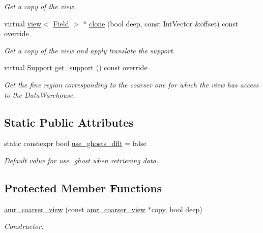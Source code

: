 \begin{DoxyCompactItemize}
\begin{DoxyCompactList}\small\item\em Get a copy of the view. \end{DoxyCompactList}\item 
virtual \hyperlink{classUintah_1_1PhaseField_1_1detail_1_1view}{view}$<$ \hyperlink{structUintah_1_1PhaseField_1_1ScalarField}{Field} $>$ $\ast$ \hyperlink{classUintah_1_1PhaseField_1_1detail_1_1amr__coarser__view_3_01ScalarField_3_01T_01_4_00_01Proble9cadea116dab5bdb44bb3e29abbe99ef_ac4654e84d3f8f4498e45eddfe0818370}{clone} (bool deep, const Int\+Vector \&offset) const override
\begin{DoxyCompactList}\small\item\em Get a copy of the view and apply translate the support. \end{DoxyCompactList}\item 
virtual \hyperlink{classUintah_1_1PhaseField_1_1Support}{Support} \hyperlink{classUintah_1_1PhaseField_1_1detail_1_1amr__coarser__view_3_01ScalarField_3_01T_01_4_00_01Proble9cadea116dab5bdb44bb3e29abbe99ef_a783d09b56009a7b0bcb0eb981c49a710}{get\+\_\+support} () const override
\begin{DoxyCompactList}\small\item\em Get the fine region corresponding to the coarser one for which the view has access to the Data\+Warehouse. \end{DoxyCompactList}\end{DoxyCompactItemize}
\subsection*{Static Public Attributes}
\begin{DoxyCompactItemize}
\item 
static constexpr bool \hyperlink{classUintah_1_1PhaseField_1_1detail_1_1amr__coarser__view_3_01ScalarField_3_01T_01_4_00_01Proble9cadea116dab5bdb44bb3e29abbe99ef_ace77967592bbb525ac1e29555bb317cd}{use\+\_\+ghosts\+\_\+dflt} = false
\begin{DoxyCompactList}\small\item\em Default value for use\+\_\+ghost when retrieving data. \end{DoxyCompactList}\end{DoxyCompactItemize}
\subsection*{Protected Member Functions}
\begin{DoxyCompactItemize}
\item 
\hyperlink{classUintah_1_1PhaseField_1_1detail_1_1amr__coarser__view_3_01ScalarField_3_01T_01_4_00_01Proble9cadea116dab5bdb44bb3e29abbe99ef_a01447da34e14e479a121699cd8f4d6a2}{amr\+\_\+coarser\+\_\+view} (const \hyperlink{classUintah_1_1PhaseField_1_1detail_1_1amr__coarser__view}{amr\+\_\+coarser\+\_\+view} $\ast$copy, bool deep)
\begin{DoxyCompactList}\small\item\em Constructor. \end{DoxyCompactList}\end{DoxyCompactItemize}
